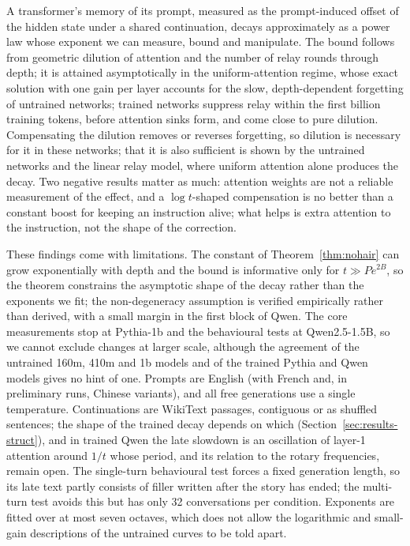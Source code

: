 \documentclass[11pt]{article}
\theoremstyle{definition}
\theoremstyle{remark}
\begin{document}
A transformer's memory of its prompt, measured as the prompt-induced offset of the hidden state under a shared continuation, decays approximately as a power law whose exponent we can measure, bound and manipulate. The bound follows from geometric dilution of attention and the number of relay rounds through depth; it is attained asymptotically in the uniform-attention regime, whose exact solution with one gain per layer accounts for the slow, depth-dependent forgetting of untrained networks; trained networks suppress relay within the first billion training tokens, before attention sinks form, and come close to pure dilution. Compensating the dilution removes or reverses forgetting, so dilution is necessary for it in these networks; that it is also sufficient is shown by the untrained networks and the linear relay model, where uniform attention alone produces the decay. Two negative results matter as much: attention weights are not a reliable measurement of the effect, and a $\log t$-shaped compensation is no better than a constant boost for keeping an instruction alive; what helps is extra attention to the instruction, not the shape of the correction.

These findings come with limitations. The constant of Theorem~\ref{thm:nohair} can grow exponentially with depth and the bound is informative only for $t\gg Pe^{2B}$, so the theorem constrains the asymptotic shape of the decay rather than the exponents we fit; the non-degeneracy assumption is verified empirically rather than derived, with a small margin in the first block of Qwen. The core measurements stop at Pythia-1b and the behavioural tests at Qwen2.5-1.5B, so we cannot exclude changes at larger scale, although the agreement of the untrained 160m, 410m and 1b models and of the trained Pythia and Qwen models gives no hint of one. Prompts are English (with French and, in preliminary runs, Chinese variants), and all free generations use a single temperature. Continuations are WikiText passages, contiguous or as shuffled sentences; the shape of the trained decay depends on which (Section~\ref{sec:results-struct}), and in trained Qwen the late slowdown is an oscillation of layer-1 attention around $1/t$ whose period, and its relation to the rotary frequencies, remain open. The single-turn behavioural test forces a fixed generation length, so its late text partly consists of filler written after the story has ended; the multi-turn test avoids this but has only 32 conversations per condition. Exponents are fitted over at most seven octaves, which does not allow the logarithmic and small-gain descriptions of the untrained curves to be told apart.
\end{document}
